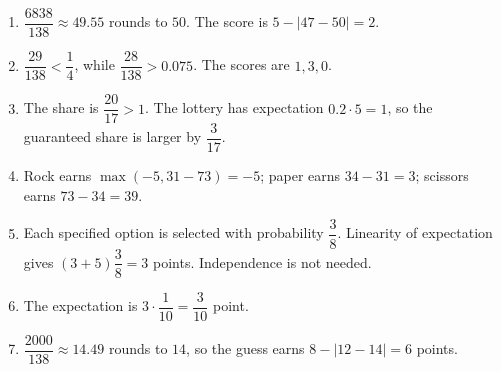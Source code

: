 \begin{enumerate}
\item $\dfrac{6838}{138}\approx49.55$ rounds to $50$. The score is $5-|47-50|=2$.
\item $\dfrac{29}{138}<\dfrac{1}{4}$, while $\dfrac{28}{138}>0.075$. The scores are $1,3,0$.
\item The share is $\dfrac{20}{17}>1$. The lottery has expectation $0.2\cdot5=1$, so the guaranteed share is larger by $\dfrac{3}{17}$.
\item Rock earns $\max(-5,31-73)=-5$; paper earns $34-31=3$; scissors earns $73-34=39$.
\item Each specified option is selected with probability $\dfrac{3}{8}$. Linearity of expectation gives $(3+5)\dfrac{3}{8}=3$ points. Independence is not needed.
\item The expectation is $3\cdot\dfrac{1}{10}=\dfrac{3}{10}$ point.
\item $\dfrac{2000}{138}\approx14.49$ rounds to $14$, so the guess earns $8-|12-14|=6$ points.
\end{enumerate}
